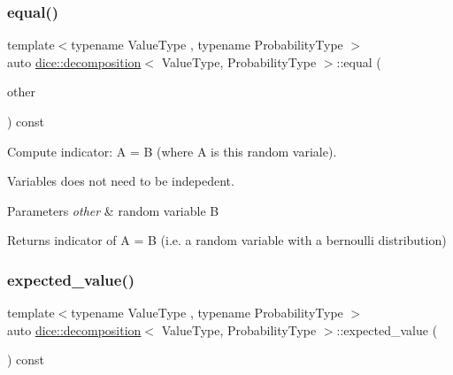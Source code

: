 \subsubsection{\texorpdfstring{equal()}{equal()}}
{\footnotesize\ttfamily template$<$typename Value\+Type , typename Probability\+Type $>$ \\
auto \mbox{\hyperlink{classdice_1_1decomposition}{dice\+::decomposition}}$<$ Value\+Type, Probability\+Type $>$\+::equal (\begin{DoxyParamCaption}\item[{const \mbox{\hyperlink{classdice_1_1decomposition}{decomposition}}$<$ Value\+Type, Probability\+Type $>$ \&}]{other }\end{DoxyParamCaption}) const\hspace{0.3cm}{\ttfamily [inline]}}



Compute indicator\+: A = B (where A is this random variale). 

Variables does not need to be indepedent.


\begin{DoxyParams}{Parameters}
{\em other} & random variable B\\
\hline
\end{DoxyParams}
\begin{DoxyReturn}{Returns}
indicator of A = B (i.\+e. a random variable with a bernoulli distribution) 
\end{DoxyReturn}
\mbox{\label{classdice_1_1decomposition_afac577e983fb2d45591c536e1741f3d8}} 
\subsubsection{\texorpdfstring{expected\+\_\+value()}{expected\_value()}}
{\footnotesize\ttfamily template$<$typename Value\+Type , typename Probability\+Type $>$ \\
auto \mbox{\hyperlink{classdice_1_1decomposition}{dice\+::decomposition}}$<$ Value\+Type, Probability\+Type $>$\+::expected\+\_\+value (\begin{DoxyParamCaption}{ }\end{DoxyParamCaption}) const\hspace{0.3cm}{\ttfamily [inline]}}




